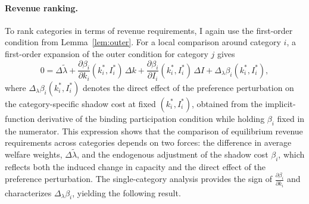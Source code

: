 \documentclass{class}
\begin{document}
\paragraph{Revenue ranking.} To rank categories in terms of revenue requirements, I again use the first-order condition from Lemma~\ref{lem:outer}. For a local comparison around category \(i\), a first-order expansion of the outer condition for category \(j\) gives
\[
0
=
\Delta\tilde\lambda
+
\frac{\partial \beta_i}{\partial k_i}(k_i^\ast,I_i^\ast)\,\Delta k
+
\frac{\partial \beta_i}{\partial I_i}(k_i^\ast,I_i^\ast)\,\Delta I
+
\Delta_{\lambda}\beta_i(k_i^\ast,I_i^\ast),
\]
where \(\Delta_{\lambda}\beta_i(k_i^\ast,I_i^\ast)\) denotes the direct effect of the preference perturbation on the category-specific shadow cost at fixed \((k_i^\ast,I_i^\ast)\), obtained from the implicit-function derivative of the binding participation condition while holding \(\beta_i\) fixed in the numerator. This expression shows that the comparison of equilibrium revenue requirements across categories depends on two forces: the difference in average welfare weights, \(\Delta\tilde\lambda\), and the endogenous adjustment of the shadow cost \(\beta_i\), which reflects both the induced change in capacity and the direct effect of the preference perturbation. The single-category analysis provides the sign of \(\frac{\partial  \beta_i}{\partial k_i}\) and characterizes \(\Delta_{\lambda}\beta_i\), yielding the following result.
\end{document}
